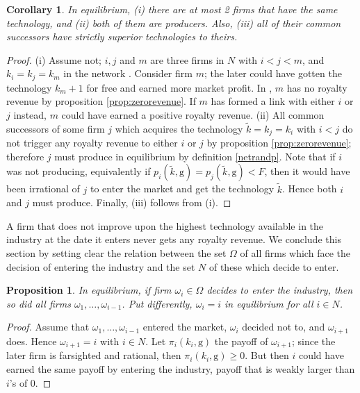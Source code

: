 \documentclass{article}
\newtheorem{corollary}{Corollary}
\newtheorem{proposition}{Proposition}
\begin{document}
\begin{corollary}\label{firmswithsametech}
In equilibrium, (i) there are at most 2 firms that have the same technology, and (ii) both of them are producers. Also, (iii) all of their common successors have strictly superior technologies to theirs. 
\end{corollary}
\begin{proof}
(i) Assume not; $i,j$ and $m$ are three firms in $N$ with $i<j<m$, and $k_i=k_j=k_m$ in the network . Consider firm $m$; the later could have gotten the technology $k_m+1$ for free and earned more market profit. In , $m$ has no royalty revenue by proposition \ref{prop:zerorevenue}. If $m$ has formed a link with either $i$ or $j$ instead, $m$ could have earned a positive royalty revenue. (ii) All common successors of some firm $j$ which acquires the technology $\tilde{k}=k_j=k_i$ with $i<j$ do not trigger any royalty revenue to either $i$ or $j$ by proposition \ref{prop:zerorevenue}; therefore $j$ must produce in equilibrium by definition \ref{netrandp}. Note that if $i$ was not producing, equivalently if $p_i(\tilde{k},\text{g})=p_j(\tilde{k},\text{g})< F$, then it would have been irrational of $j$ to enter the market and get the technology $\tilde{k}$. Hence both $i$ and $j$ must produce. Finally, (iii) follows from (i). 
\end{proof}

A firm that does not improve upon the highest technology available in the industry at the date it enters never gets any royalty revenue. We conclude this section by setting clear the relation between the set $\Omega$ of all firms which face the decision of entering the industry and the set $N$ of these which decide to enter. 

\begin{proposition}
In equilibrium, if firm $\omega_i\in \Omega$ decides to enter the industry, then so did all firms $\omega_1,\ldots, \omega_{i-1}$. Put differently, $\omega_i=i$ in equilibrium for all $i\in N$. 
\end{proposition}
\begin{proof}
Assume that $\omega_1,\ldots, \omega_{i-1}$ entered the market, $\omega_i$ decided not to, and $\omega_{i+1}$ does. Hence $\omega_{i+1}=i$ with $i\in N$. Let $\pi_i(k_i,\text{g})$ the payoff of $\omega_{i+1}$; since the later firm is farsighted and rational, then $\pi_i(k_i,\text{g})\geq 0$. But then $i$ could have earned the same payoff by entering the industry, payoff that is weakly larger than $i$'s of 0. 
\end{proof}
\end{document}
